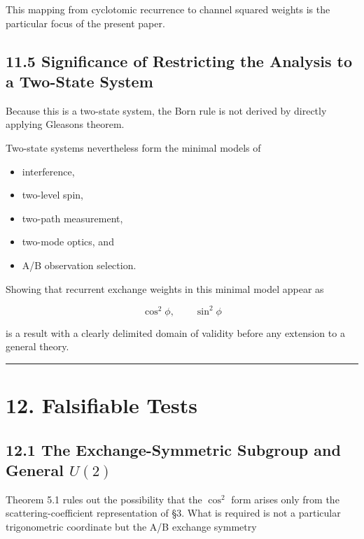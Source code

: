 \documentclass[
  a4paper,
  10pt]{article}
\providecommand{\tightlist}{%
  \setlength{\itemsep}{0pt}\setlength{\parskip}{0pt}}
\begin{document}
This mapping from cyclotomic recurrence to channel squared weights is
the particular focus of the present paper.

\subsection{11.5 Significance of Restricting the Analysis to a Two-State
System}\label{115-significance-of-restricting-the-analysis-to-a-two-state-system}

Because this is a two-state system, the Born rule is not derived by
directly applying Gleason\textquotesingle s theorem.

Two-state systems nevertheless form the minimal models of

\begin{itemize}
\tightlist
\item
  interference,
\item
  two-level spin,
\item
  two-path measurement,
\item
  two-mode optics, and
\item
  A/B observation selection.
\end{itemize}

Showing that recurrent exchange weights in this minimal model appear as

\[
\cos^2\phi,
\qquad
\sin^2\phi
\]

is a result with a clearly delimited domain of validity before any
extension to a general theory.

\begin{center}\rule{0.5\linewidth}{0.5pt}\end{center}

\section{12. Falsifiable Tests}\label{12-falsifiable-tests}

\subsection{\texorpdfstring{12.1 The Exchange-Symmetric Subgroup and
General
\(U(2)\)}{12.1 The Exchange-Symmetric Subgroup and General U(2)}}\label{121-the-exchange-symmetric-subgroup-and-general-u2}

Theorem 5.1 rules out the possibility that the \(\cos^2\) form arises
only from the scattering-coefficient representation of §3. What is
required is not a particular trigonometric coordinate but the A/B
exchange symmetry
\end{document}
